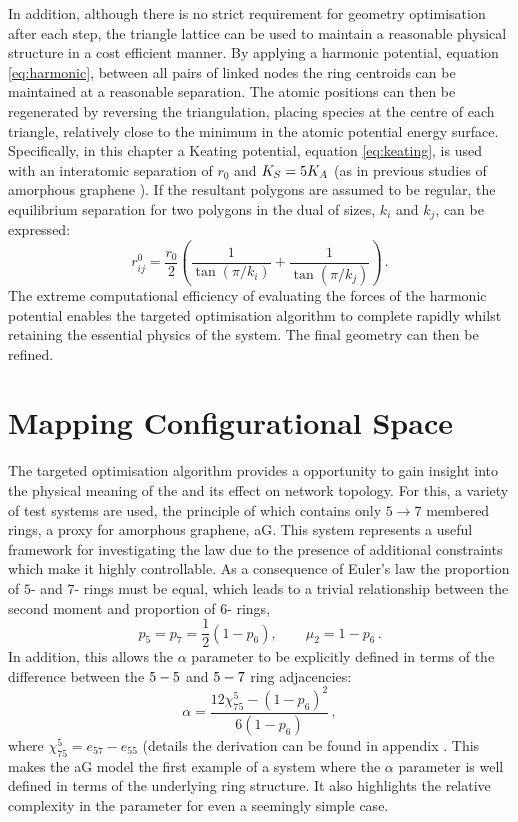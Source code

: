 In addition, although there is no strict requirement for geometry optimisation after each step, the triangle lattice can be used to maintain a reasonable physical structure in a cost efficient manner.
By applying a harmonic potential, equation \eqref{eq:harmonic}, between all pairs of linked nodes the ring centroids can be maintained at a reasonable separation.
The atomic positions can then be regenerated by reversing the triangulation, placing species at the centre of each triangle, relatively close to the minimum in the atomic potential energy surface.
Specifically, in this chapter a Keating potential, equation \eqref{eq:keating}, is used  with an interatomic separation of $r_0$ and $K_S=5K_A$ (as in previous studies of amorphous graphene \cite{Kumar2012}).
If the resultant polygons are assumed to be regular, the equilibrium separation for two polygons in the dual of sizes, $k_i$ and $k_j$, can be expressed:
\begin{equation}
	r_{ij}^0 = \frac{r_0}{2}\left(\frac{1}{\tan\left(\pi/k_i\right)}+\frac{1}{\tan\left(\pi/k_j\right)}\right)\,.
\end{equation}
The extreme computational efficiency of evaluating the forces of the harmonic potential enables the targeted optimisation algorithm to complete rapidly whilst retaining the essential physics of the system.
The final geometry can then be refined.

\section{Mapping Configurational Space}

The targeted optimisation algorithm provides a opportunity to gain insight into the physical meaning of the \aw{} and its effect on network topology.
For this, a variety of test systems are used, the principle of which contains only $5\rightarrow 7$ membered rings, a proxy for amorphous graphene, aG.
This system represents a useful framework for investigating the \aw{} law due to the presence of additional constraints which make it highly controllable. As a consequence of Euler's law the proportion of $5$\-- and $7$\-- rings must be equal, which leads to a trivial relationship between the second moment and proportion of $6$- rings,
\begin{equation}
\label{eq:agcon}
        p_5=p_7=\frac{1}{2}\left(1-p_6\right), \qquad \mu_2=1-p_6 \,.
\end{equation}
In addition, this allows the $\alpha$ parameter to be explicitly defined in terms of the difference between the $5\--5$ and $5\--7$ ring adjacencies:
\begin{equation}
	\alpha = \frac{12\chi_{75}^5-\left(1-p_6\right)^2}{6\left(1-p_6\right)}\,,
\end{equation}
where $\chi_{75}^5=e_{57}-e_{55}$ (details the derivation can be found in appendix .
This makes the aG model the first example of a system where the $\alpha$ parameter is well defined in terms of the underlying ring structure.
It also highlights the relative complexity in the \aw{} parameter for even a seemingly simple case.

